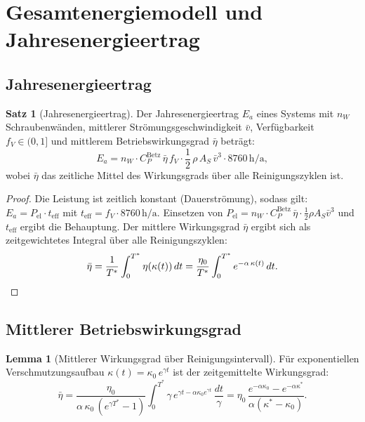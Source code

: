 ﻿\documentclass[a4paper,12pt]{article}
\theoremstyle{definition}
\newtheorem{satz}{Satz}
\newtheorem{lemma}{Lemma}
\begin{document}
\section{Gesamtenergiemodell und Jahresenergieertrag}

\subsection{Jahresenergieertrag}

\begin{satz}[Jahresenergieertrag]
\label{satz:jahresertrag}
Der Jahresenergieertrag $E_a$ eines Systems mit $n_W$ Schraubenwänden, mittlerer
Strömungsgeschwindigkeit $\bar{v}$, Verfügbarkeit $f_V \in (0,1]$ und mittlerem
Betriebswirkungsgrad $\bar{\eta}$ beträgt:
\[
  E_a = n_W \cdot C_P^{\mathrm{Betz}}\,\bar{\eta}\,f_V \cdot
        \frac{1}{2}\,\rho\,A_S\,\bar{v}^3 \cdot 8760\,\mathrm{h/a},
\]
wobei $\bar{\eta}$ das zeitliche Mittel des Wirkungsgrads über alle Reinigungszyklen ist.
\end{satz}

\begin{proof}
Die Leistung ist zeitlich konstant (Dauerströmung), sodass gilt:
$E_a = P_{\mathrm{el}} \cdot t_{\mathrm{eff}}$ mit $t_{\mathrm{eff}} = f_V \cdot 8760\,\mathrm{h/a}$.
Einsetzen von $P_{\mathrm{el}} = n_W \cdot C_P^{\mathrm{Betz}}\,\bar{\eta} \cdot \frac{1}{2}\rho A_S \bar{v}^3$
und $t_{\mathrm{eff}}$ ergibt die Behauptung. Der mittlere Wirkungsgrad $\bar{\eta}$ ergibt
sich als zeitgewichtetes Integral über alle Reinigungszyklen:
\[
  \bar{\eta} = \frac{1}{T^*}\int_0^{T^*} \eta(\kappa(t))\,dt
             = \frac{\eta_0}{T^*}\int_0^{T^*} e^{-\alpha\,\kappa(t)}\,dt. \qedhere
\]
\end{proof}

\subsection{Mittlerer Betriebswirkungsgrad}

\begin{lemma}[Mittlerer Wirkungsgrad über Reinigungsintervall]
\label{lem:mittlerwirkungsgrad}
Für exponentiellen Verschmutzungsaufbau $\kappa(t) = \kappa_0\,e^{\gamma t}$ ist
der zeitgemittelte Wirkungsgrad:
\[
  \bar{\eta} = \frac{\eta_0}{\alpha\,\kappa_0\,(e^{\gamma T^*} - 1)}
               \int_0^{T^*} \gamma\,e^{\gamma t - \alpha\kappa_0 e^{\gamma t}}\,\frac{dt}{\gamma}
             = \eta_0\,\frac{e^{-\alpha\kappa_0} - e^{-\alpha\kappa^*}}{\alpha(\kappa^* - \kappa_0)}.
\]
\end{lemma}
\end{document}
